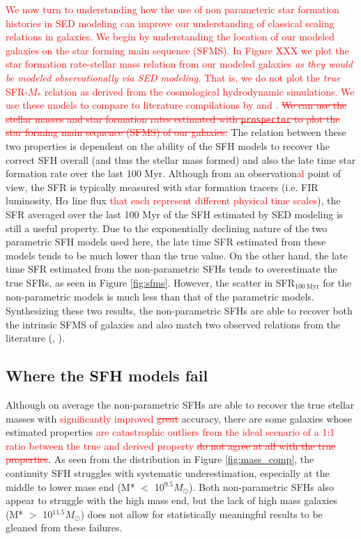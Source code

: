 \documentclass[twocolumn]{aastex62}
\newcommand{\red}[1]{{\textcolor{red}{#1}}}
\begin{document}
\red{We now turn to understanding how the use of non parameteric star formation histories in SED modeling can improve our understanding of classical scaling relations in galaxies.  We begin by understanding the location of our modeled galaxies on the star forming main sequence (SFMS).  In Figure XXX we plot the star formation rate-stellar mass relation from our modeled galaxies {\it as they would be modeled observationally via SED modeling.}  That is, we do not plot the {\it true} SFR-$M_*$ relation as derived from the cosmological hydrodynamic simulations.  We use these models to compare to literature compilations by \citet{schreiber_herschel_2015} and \citet{boogaard_muse_2018}. \sout{We can use the stellar masses and star formation rates estimated with \texttt{prospector} to plot the star forming main sequence (SFMS) of our galaxies.}} The relation between these two properties is dependent on the ability of the SFH models to recover the correct SFH overall (and thus the stellar mass formed) and also the late time star formation rate over the last 100 Myr. Although from an observation\red{al} point of view, the SFR is typically measured with star formation tracers (i.e. FIR luminosity, H$\alpha$ line flux \red{that each represent different physical time scales}), the SFR averaged over the last 100 Myr of the SFH estimated by SED modeling is still a useful property. Due to the exponentially declining nature of the two parametric SFH models used here, the late time SFR estimated from these models tends to be much lower than the true value. On the other hand, the late time SFR estimated from the non-parametric SFHs tends to overestimate the true SFRs, as seen in Figure \ref{fig:sfms}. However, the scatter in SFR$_{100 \: \mathrm{Myr}}$ for the non-parametric models is much less than that of the parametric models. Synthesizing these two results, the non-parametric SFHs are able to recover both the intrinsic SFMS of galaxies and also match two observed relations from the literature (\cite{boogaard_muse_2018}, \cite{schreiber_herschel_2015}). 

\subsection{Where the SFH models fail}


Although on average the non-parametric SFHs are able to recover the true stellar masses with \red{significantly improved \sout{great}} accuracy, there are some galaxies whose estimated properties \red{are catastrophic outliers from the ideal scenario of a 1:1 ratio between the true and derived property \sout{do not agree at all with the true properties}}. As seen from the distribution in Figure \ref{fig:mass_comp}, the continuity SFH struggles with systematic underestimation, especially at the middle to lower mass end (M* $<$ 10$^{9.5} M_{\odot}$). Both non-parametric SFHs also appear to struggle with the high mass end, but the lack of high mass galaxies (M* $>$ 10$^{11.5} M_{\odot}$) does not allow for statistically meaningful results to be gleaned from these failures. 
\end{document}
